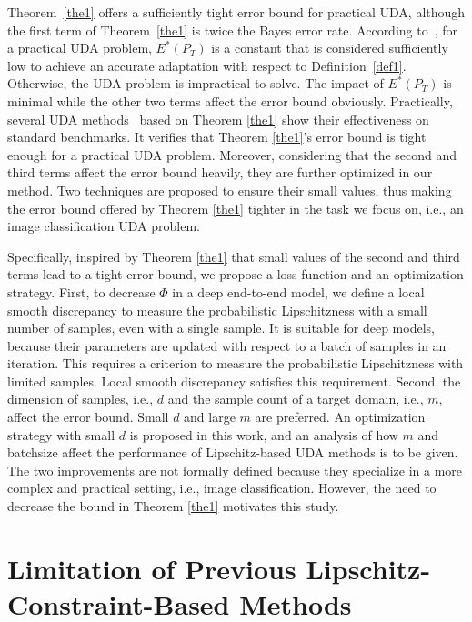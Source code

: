 \documentclass[journal,twocolumn]{IEEEtran}
\theoremstyle{definition}
\begin{document}
Theorem~\ref{the1} offers a sufficiently tight error bound for practical UDA, although the first term of Theorem~\ref{the1} is twice the Bayes error rate. According to~\cite{ben2010theory,saito2018maximum}, for a practical UDA problem, $E^*(P_T)$ is a constant that is considered sufficiently low to achieve an accurate adaptation with respect to Definition~\ref{def1}. Otherwise, the UDA problem is impractical to solve. The impact of $E^*(P_T)$ is minimal while the other two terms affect the error bound obviously. Practically, several UDA methods~\cite{shu2018a,mao2019virtual} based on Theorem \ref{the1} show their effectiveness on standard benchmarks. It verifies that Theorem \ref{the1}'s error bound is tight enough for a practical UDA problem. Moreover, considering that the second and third terms affect the error bound heavily, they are further optimized in our method. Two techniques are proposed to ensure their small values, thus making the error bound offered by Theorem \ref{the1} tighter  in the task we focus on, i.e., an image classification UDA problem.

Specifically, inspired by Theorem \ref{the1} that small values of the second and third terms lead to a tight error bound, we propose a loss function and an optimization  strategy. First, to decrease $\Phi$ in a deep end-to-end model, we define a local smooth discrepancy to measure the  probabilistic Lipschitzness with a small number of samples, even with a single sample. It is suitable for deep models, because their parameters are updated with respect to a batch of samples in an iteration. This requires a criterion to measure the probabilistic Lipschitzness with limited samples. Local smooth discrepancy satisfies this requirement. Second, the dimension of samples, i.e., $d$ and the sample count of a target domain, i.e., $m$, affect the error bound. Small $d$ and large $m$ are preferred. An optimization strategy with small $d$ is proposed in this work, and an analysis of how $m$ and batchsize affect the performance of Lipschitz-based UDA methods is to be given. The two improvements are not formally defined because they specialize in a more complex and practical setting, i.e., image classification. However, the need to decrease the bound in Theorem \ref{the1} motivates this study.



\section{Limitation of Previous Lipschitz-Constraint-Based Methods}
\end{document}
